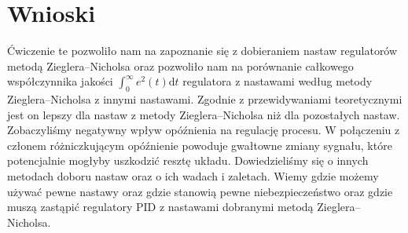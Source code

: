 \documentclass[a4paper, 12pt]{article}
\begin{document}
	\section{Wnioski}
		Ćwiczenie te pozwoliło nam na zapoznanie się z dobieraniem nastaw regulatorów metodą Zieglera--Nicholsa oraz pozwoliło nam na porównanie całkowego współczynnika jakości $\int_0^\infty e^2(t) \mathrm{d}t$ regulatora z nastawami według metody Zieglera--Nicholsa z innymi nastawami. Zgodnie z przewidywaniami teoretycznymi jest on lepszy dla nastaw z metody Zieglera--Nicholsa niż dla pozostałych nastaw.
		\newline
		\newline
		Zobaczyliśmy negatywny wpływ opóźnienia na regulację procesu. W połączeniu z członem różniczkującym opóźnienie powoduje gwałtowne zmiany sygnału, które potencjalnie mogłyby uszkodzić resztę układu. 
		\newline
		\newline
		Dowiedzieliśmy się o innych metodach doboru nastaw oraz o ich wadach i zaletach. Wiemy gdzie możemy używać pewne nastawy oraz gdzie stanowią pewne niebezpieczeństwo oraz gdzie muszą zastąpić regulatory PID z nastawami dobranymi metodą Zieglera--Nicholsa.
\end{document}
